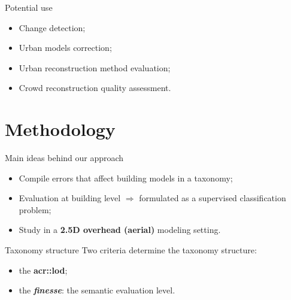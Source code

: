 \documentclass[10pt, export]{beamer}
\begin{document}
        \begin{frame}{Potential use}
            \begin{itemize}[label=$\blacktriangleright$, font=\color{IGNGreen}, itemsep=2em]
                \item<1-> Change detection;
                \item<2-> Urban models correction;
                \item<3-> Urban reconstruction method evaluation;
                \item<4-> Crowd reconstruction quality assessment.
            \end{itemize}
        \end{frame}

    \section{Methodology}
        \begin{frame}{Main ideas behind our approach}
            \begin{itemize}[label=$\blacktriangleright$, font=\color{IGNGreen}, itemsep=2em]
                \item<1-> Compile errors that affect building models in a taxonomy;
                \item<2-> Evaluation at building level $\Longrightarrow$ formulated as a supervised classification problem;
                \item<3-> Study in a \textbf{2.5D overhead (aerial)} modeling setting.
            \end{itemize}
        \end{frame}
        \begin{frame}{Taxonomy structure}
            Two criteria determine the taxonomy structure:
            \begin{itemize}[label=$\blacktriangleright$, font=\color{IGNGreen}, itemsep=2em]
                \item<2-> the \textbf{\acrfull{acr::lod}};
                \item<3-> the \textbf{\emph{finesse}}: the semantic evaluation level.
            \end{itemize}
            ~\\
        \end{frame}
\end{document}
